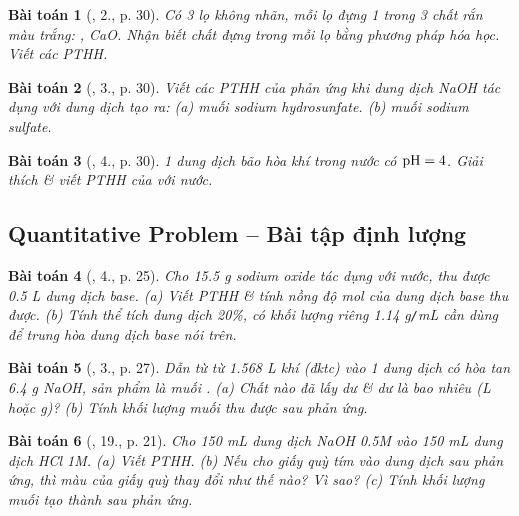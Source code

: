 \documentclass{article}
\newtheorem{baitoan}{Bài toán}
\begin{document}
\begin{baitoan}[\cite{SGK_Hoa_Hoc_9}, 2., p. 30]
	Có 3 lọ không nhãn, mỗi lọ đựng 1 trong 3 chất rắn màu trắng: \emph{, CaO}. Nhận biết chất đựng trong mỗi lọ bằng phương pháp hóa học. Viết các PTHH.
\end{baitoan}

\begin{baitoan}[\cite{SGK_Hoa_Hoc_9}, 3., p. 30]
	Viết các PTHH của phản ứng khi dung dịch \emph{NaOH} tác dụng với dung dịch \emph{} tạo ra: (a) muối sodium hydrosunfate. (b) muối sodium sulfate.
\end{baitoan}

\begin{baitoan}[\cite{SGK_Hoa_Hoc_9}, 4., p. 30]
	1 dung dịch bão hòa khí \emph{} trong nước có $\rm pH = 4$. Giải thích \& viết PTHH của \emph{} với nước.
\end{baitoan}

\subsection{Quantitative Problem -- Bài tập định lượng}

\begin{baitoan}[\cite{SGK_Hoa_Hoc_9}, 4., p. 25]
	Cho \emph{15.5 g} sodium oxide \emph{} tác dụng với nước, thu được \emph{0.5 L} dung dịch base. (a) Viết PTHH \& tính nồng độ mol của dung dịch base thu được. (b) Tính thể tích dung dịch \emph{ 20\%}, có khối lượng riêng \emph{1.14 g\texttt{/}mL} cần dùng để trung hòa dung dịch base nói trên.
\end{baitoan}

\begin{baitoan}[\cite{SGK_Hoa_Hoc_9}, 3., p. 27]
	Dẫn từ từ \emph{1.568 L} khí \emph{} (đktc) vào 1 dung dịch có hòa tan \emph{6.4 g NaOH}, sản phẩm là muối \emph{}. (a) Chất nào đã lấy dư \& dư là bao nhiêu (\emph{L} hoặc \emph{g})? (b) Tính khối lượng muối thu được sau phản ứng.
\end{baitoan}

\begin{baitoan}[\cite{An_350_BT_Hoa_Hoc_9}, 19., p. 21]
	Cho \emph{150 mL} dung dịch \emph{NaOH 0.5M} vào \emph{150 mL} dung dịch \emph{HCl 1M}. (a) Viết PTHH. (b) Nếu cho giấy quỳ tím vào dung dịch sau phản ứng, thì màu của giấy quỳ thay đổi như thế nào? Vì sao? (c) Tính khối lượng muối tạo thành sau phản ứng.
\end{baitoan}
\end{document}
